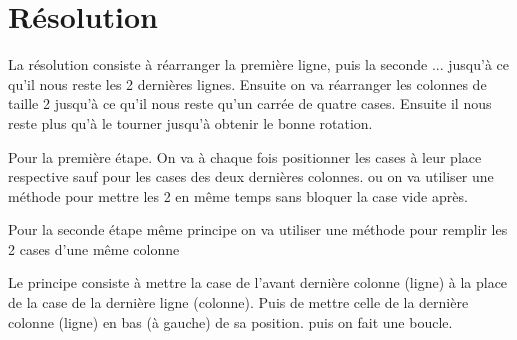 \documentclass[a4paper]{article}
\begin{document}
\section{Résolution}

La résolution consiste à réarranger la première ligne, puis la seconde
... jusqu'à ce qu'il nous reste les 2 dernières lignes. Ensuite on va réarranger
les colonnes de taille 2 jusqu'à ce qu'il nous reste qu'un carrée de quatre
cases. Ensuite il nous reste plus qu'à le tourner jusqu'à obtenir le bonne
rotation.

Pour la première étape. On va à chaque fois positionner les cases à leur place
respective sauf pour les cases des deux dernières colonnes. ou on va utiliser
une méthode pour mettre les 2 en même temps sans bloquer la case vide après.

Pour la seconde étape même principe on va utiliser une méthode pour remplir les
2 cases d'une même colonne

Le principe consiste à mettre la case de l'avant dernière colonne (ligne) à la
place de la case de la dernière ligne (colonne). Puis de mettre celle de la
dernière colonne (ligne) en bas (à gauche) de sa position. puis on fait une
boucle.
\end{document}
